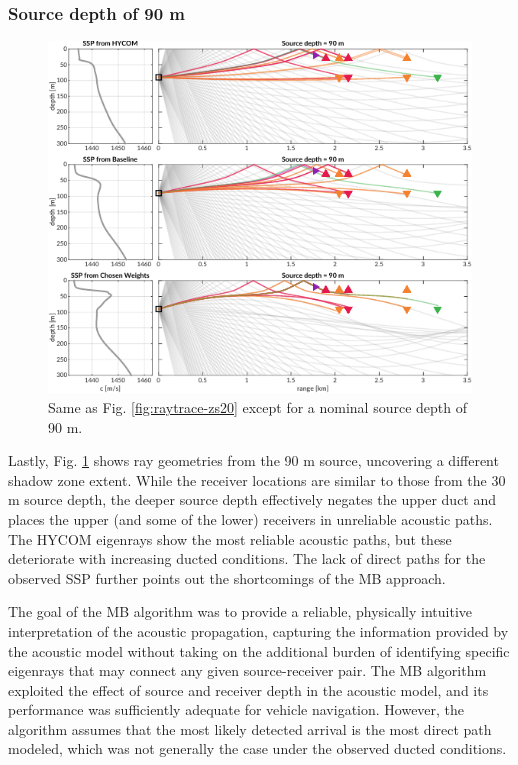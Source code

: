 \documentclass[preprint,TurnOnLineNumbers]{JASA}
\begin{document}
\subsubsection{Source depth of 90 m}
\begin{figure}[ht!]
  \centering
  \includegraphics[width=\columnwidth]{Fig8.pdf}
  \caption{Same as Fig. \ref{fig:raytrace-zs20} except for a nominal source depth of 90 m.}
  \label{fig:raytrace-zs90}
\end{figure}

Lastly, Fig. \ref{fig:raytrace-zs90} shows ray geometries from the 90 m source, uncovering a different shadow zone extent.
While the receiver locations are similar to those from the 30 m source depth, the deeper source depth effectively negates the upper duct and places the upper (and some of the lower) receivers in unreliable acoustic paths.
The HYCOM eigenrays show the most reliable acoustic paths, but these deteriorate with increasing ducted conditions.
The lack of direct paths for the observed SSP further points out the shortcomings of the MB approach.

The goal of the MB algorithm was to provide a reliable, physically intuitive interpretation of the acoustic propagation, capturing the information provided by the acoustic model without taking on the additional burden of identifying specific eigenrays that may connect any given source-receiver pair.
The MB algorithm exploited the effect of source and receiver depth in the acoustic model, and its performance was sufficiently adequate for vehicle navigation.
However, the algorithm assumes that the most likely detected arrival is the most direct path modeled, which was not generally the case under the observed ducted conditions. 
\end{document}
